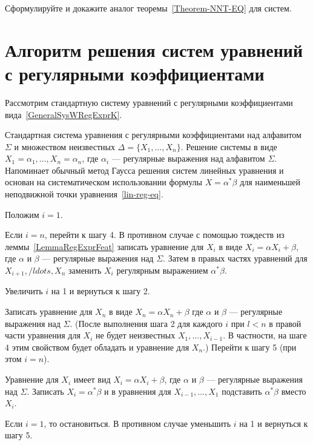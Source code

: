 \begin{myproblem}
Сформулируйте и докажите аналог теоремы~\ref{Theorem-NNT-EQ} для систем.
\end{myproblem}

\section{Алгоритм решения систем уравнений с регулярными коэффициентами}
\label{Chapter2SysSolverAlg}

Рассмотрим стандартную систему уравнений с регулярными коэффициентами вида~\eqref{GeneralSysWRegExprK}.


{\label{Algo-SysEq-Solver} Стандартная система уравнения с регулярными коэффициентами над алфавитом $\Sigma$ и множеством неизвестных $\Delta=\{X_1,\ldots ,X_n\}$.}
{Решение системы в виде $X_1=\alpha_1,\ldots, X_n=\alpha_n$, где $\alpha_i$ --- регулярные выражения над алфавитом $\Sigma$.}
{Напоминает обычный метод Гаусса решения систем линейных уравнения и основан на систематическом использовании формулы $X=\alpha^*\beta$ для наименьшей неподвижной точки уравнения~\eqref{lin-reg-eq}.}
 {
    \item Положим $i=1$.
		
    \item Если $i=n$, перейти к шагу 4. В противном случае с помощью тождеств из леммы~\ref{LemmaRegExprFeat} записать уравнение для $X_i$ в виде $X_i=\alpha X_i+\beta$, где $\alpha$ и $\beta$ --- регулярные выражения над $\Sigma$. Затем в правых частях уравнений для $X_{i+1}, /ldots , X_n$ заменить $X_i$ регулярным выражением $\alpha^*\beta$.

    \item Увеличить $i$ на 1 и вернуться к шагу 2.

    \item Записать уравнение для $X_n$ в виде $X_n=\alpha X_n+\beta$ где $\alpha$ и $\beta$ --- регулярные выражения над $\Sigma$. (После выполнения шага 2 для каждого $i$ при $l<n$ в правой части уравнения для $X_i$ не будет неизвестных $X_1, \ldots,X_{i-1}$. В частности, на шаге 4 этим свойством будет обладать и уравнение для $X_n$.) Перейти к шагу 5 (при этом $i=n$).

    \item Уравнение для $X_i$ имеет вид $X_i=\alpha X_i+\beta$, где $\alpha$ и $\beta$ --- регулярные выражения над $\Sigma$. Записать $X_i=\alpha^*\beta$ и в уравнения для $X_{i-1}, \ldots , X_1$ подставить $\alpha^*\beta$ вместо $X_i$.

    \item Если $i=1$, то остановиться. В противном случае уменьшить $i$ на 1 и вернуться к шагу 5.
		}

